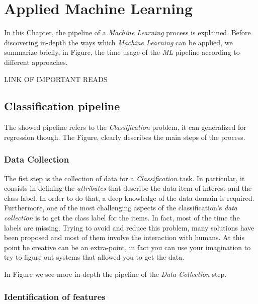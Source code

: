 

\section{Applied Machine Learning}

In this Chapter, the pipeline of a \emph{Machine Learning} process is explained. Before discovering in-depth the ways which \emph{Machine Learning} can be applied, we summarize briefly, in Figure, the time usage of the \emph{ML} pipeline according to different approaches. 

LINK OF IMPORTANT READS 


\subsection{Classification pipeline}

The showed pipeline refers to the \emph{Classification} problem, it can generalized for regression though. The Figure, clearly describes the main steps of the process.


\subsubsection{Data Collection}

The fist step is the collection of data for a \emph{Classification} task. In particular, it consists in defining the \emph{attributes} that describe the data item of interest and the class label. In order to do that, a deep knowledge of the data domain is required. Furthermore, one of the most challenging aspects of the classification's \emph{data collection} is to get the class label for the items. In fact, most of the time the labels are missing. Trying to avoid and reduce this problem, many solutions have been proposed and most of them involve the interaction with humans. At this point be creative can be an extra-point, in fact you can use your imagination to try to figure out systems that allowed you to get the data.

In Figure we see more in-depth the pipeline of the \emph{Data Collection} step. 


\subsubsection*{Identification of features}

